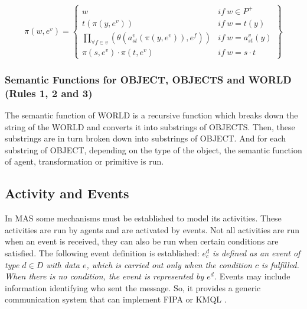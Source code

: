 \documentclass{aamas2012}
\begin{document}
\begin{small}
\begin{equation}
    \pi (w, e^v) = \left\{
    \begin{array}{ll}
        w   & \mathit{if}  \ w \in P^+  \\

        t(\pi (y, e^v))     & \mathit{if}  \  w = t(y)  \\

        \underset{\forall f \in v}{ \prod }(\theta (a_{st}^v (\pi
            (y, e^v)), e^f))    & \mathit{if}  \ w = a_{st}^v(y) \\

        \pi (s, e^v) \cdot \pi (t, e^v)    & \mathit{if}  \ w = s \cdot t
    \end{array}\right\}
\end{equation}
\end{small}



\subsubsection{Semantic Functions for OBJECT, OBJECTS and WORLD (Rules 1,
2 and 3)
\label{sec:rules123}}

The semantic function of WORLD is a recursive function
which breaks down the string of the WORLD and converts it into substrings of OBJECTS. Then, these
substrings are in turn broken down into substrings of OBJECT. And for each substring of OBJECT,
depending on the type of the object, the semantic function of agent, transformation or primitive is
run. 



\subsection{Activity and Events
\label{sec:activity_events}}

In MAS some mechanisms must be established to model its activities.
These activities are run by agents and are activated by events.
Not all activities are run when an event is received, they can also be run when certain
conditions are satisfied.
The following event definition is established: {\itshape
$e_c^d$ is defined as an event of type $d \in D$ with data $e$, which is carried out only when the
condition $c$ is fulfilled. When there is no condition, the event is
represented by $e^d$.} Events may include information identifying who sent the message. So, it provides a generic
communication system that can implement FIPA or KMQL \cite{Genesereth1995}.
\end{document}
